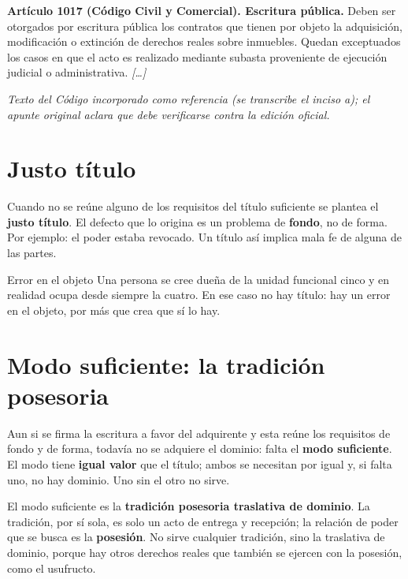\documentclass[12pt,oneside]{book}
\begin{document}
\begin{note}
\textbf{Artículo 1017 (Código Civil y Comercial). Escritura pública.} Deben ser otorgados por escritura pública los contratos que tienen por objeto la adquisición, modificación o extinción de derechos reales sobre inmuebles. Quedan exceptuados los casos en que el acto es realizado mediante subasta proveniente de ejecución judicial o administrativa. \emph{[\ldots]}

\emph{Texto del Código incorporado como referencia (se transcribe el inciso a); el apunte original aclara que debe verificarse contra la edición oficial.}
\end{note}

\section{Justo título}

Cuando no se reúne alguno de los requisitos del título suficiente se plantea el \textbf{justo título}. El defecto que lo origina es un problema de \textbf{fondo}, no de forma. Por ejemplo: el poder estaba revocado. Un título así implica mala fe de alguna de las partes.

\begin{example}{Error en el objeto}
Una persona se cree dueña de la unidad funcional cinco y en realidad ocupa desde siempre la cuatro. En ese caso no hay título: hay un error en el objeto, por más que crea que sí lo hay.
\end{example}

\section{Modo suficiente: la tradición posesoria}

Aun si se firma la escritura a favor del adquirente y esta reúne los requisitos de fondo y de forma, todavía no se adquiere el dominio: falta el \textbf{modo suficiente}. El modo tiene \textbf{igual valor} que el título; ambos se necesitan por igual y, si falta uno, no hay dominio. Uno sin el otro no sirve.

El modo suficiente es la \textbf{tradición posesoria traslativa de dominio}. La tradición, por sí sola, es solo un acto de entrega y recepción; la relación de poder que se busca es la \textbf{posesión}. No sirve cualquier tradición, sino la traslativa de dominio, porque hay otros derechos reales que también se ejercen con la posesión, como el usufructo.
\end{document}
